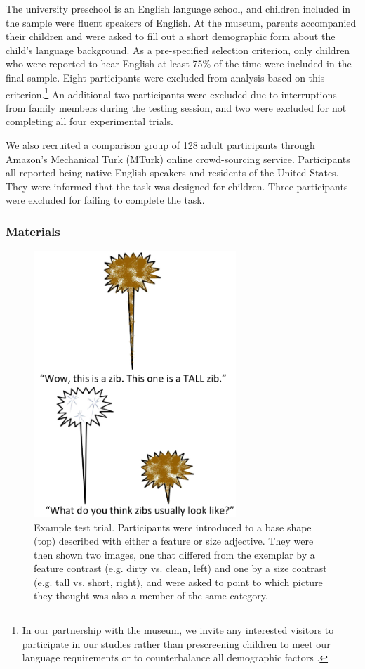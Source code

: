 \documentclass[man]{apa2}
\begin{document}
The university preschool is an English language school, and children included in the sample were fluent speakers of English. At the museum, parents accompanied their children and were asked to fill out a short demographic form about the child's language background. As a pre-specified selection criterion, only children who were reported to hear English at least 75\% of the time were included in the final sample.  Eight participants were excluded from analysis based on this criterion.\footnote{In our partnership with the museum, we invite any interested visitors to participate in our studies rather than prescreening children to meet our language requirements or to counterbalance all demographic factors \cite{callanan2012}. }  An additional two participants were excluded due to interruptions from family members during the testing session, and two were excluded for not completing all four experimental trials. 

We also recruited a comparison group of 128 adult participants through Amazon's Mechanical Turk (MTurk) online crowd-sourcing service.  Participants all reported being native English speakers and residents of the United States. They were informed that the task was designed for children. Three participants were excluded for failing to complete the task.  

\subsubsection{Materials}

\begin{figure}[t]
  \begin{center} 
    \includegraphics[width=3in]{figures/zib_example.png} 
    \caption{\label{fig:inanimate_demo} Example test trial. Participants were introduced to a base shape (top) described with either a feature or size adjective. They were then shown two images, one that differed from the exemplar by a feature contrast (e.g. dirty vs. clean, left) and one by a size contrast (e.g. tall vs. short, right), and were asked to point to which picture they thought was also a member of the same category. } 
  \end{center} 
\vspace{-10ex}
\end{figure}	
\end{document}
